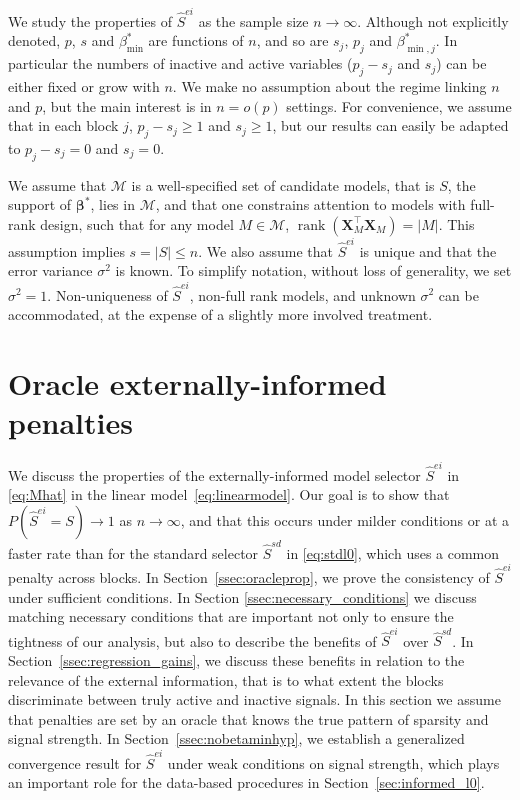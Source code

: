 \documentclass[
  12pt]{article}
\newcommand{\M}{\mathcal{M}}
\newcommand{\bbeta}{\boldsymbol{\beta}}
\newcommand{\bX}{\mathbf{X}}
\begin{document}
We study the properties of $\hat{S}^{ei}$ as the sample size $n \to \infty$.
Although not explicitly denoted, $p$, $s$ and $\beta_{\min}^*$ are functions of $n$, and so are $s_j$, $p_j$ and $\beta_{\min,j}^*$. In particular the numbers of inactive and active variables ($p_j-s_j$ and $s_j$) can be either fixed or grow with $n$. We make no assumption about the regime linking $n$ and $p$, but the main interest is in $n= o(p)$ settings. For convenience, we assume that in each block $j$, $p_j-s_j\geq1$ and $s_j\geq1$, but our results can easily be adapted to $p_j-s_j=0$ and $s_j=0$.

We assume that $\M$ is a well-specified set of candidate models, that is $S$, the support of $\bbeta^*$, lies in $\M$, and that one constrains attention to models with full-rank design, such that for any model $M \in \M$, $\operatorname{rank}(\bX_M^{\top}\bX_M)=|M|$. This assumption implies $s=|S|\leq n$. We also assume that $\hat S^{ei}$ is unique and that the error variance $\sigma^2$ is known. To simplify notation, without loss of generality, we set $\sigma^2=1$. Non-uniqueness of $\hat{S}^{ei}$, non-full rank models, and unknown $\sigma^2$ can be accommodated, at the expense of a slightly more involved treatment.

\section{Oracle externally-informed penalties}\label{sec:properties_legression}

We discuss the properties of the externally-informed model selector $\hat S^{ei}$ in \eqref{eq:Mhat} in the linear model~\eqref{eq:linearmodel}. Our goal is to show that $P(\hat S^{ei}=S)\to 1$ as $n\to\infty$, and that this occurs under milder conditions or at a faster rate than for the standard selector $\hat S^{sd}$ in \eqref{eq:stdl0}, which uses a common penalty across blocks. In Section~\ref{ssec:oracleprop}, we prove the consistency of $\hat S^{ei}$ under sufficient conditions. In Section \ref{ssec:necessary_conditions} we discuss matching necessary conditions that are important not only to ensure the tightness of our analysis, but also to describe the benefits of $\hat S^{ei}$ over $\hat{S}^{sd}$. 
In Section~\ref{ssec:regression_gains}, we discuss these benefits in relation to the relevance of the external information, that is to what extent the blocks discriminate between truly active and inactive signals. In this section we assume that penalties are set by an oracle that knows the true pattern of sparsity and signal strength. In Section~\ref{ssec:nobetaminhyp}, we establish a generalized convergence result for $\hat S^{ei}$ under weak conditions on signal strength, which plays an important role for the data-based procedures in Section~\ref{sec:informed_l0}.
\end{document}
